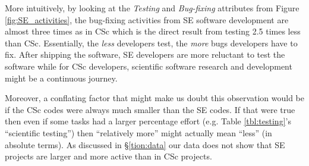\documentclass[conference,10pt]{IEEEtran}
\begin{document}
More intuitively, by looking at the \textit{Testing} and \textit{Bug-fixing} attributes from Figure \ref{fig:SE_activities}, the bug-fixing activities from SE software development are almost three times as in CSc which is the direct result from testing 2.5 times less than CSc. Essentially, the \textit{less} developers test, the \textit{more} bugs developers have to fix. After shipping the software, SE developers are more reluctant to test the software while for CSc developers, scientific software research and development might be a continuous journey.

Moreover, a conflating factor that might make us doubt this observation would be if the CSc codes were always much smaller than the SE codes. If that were true then even if some tasks had a larger percentage effort 
(e.g. Table \ref{tbl:testing}'s ``scientific testing'') then  ``relatively more'' might actually
mean ``less'' (in absolute terms). 
As discussed in \S\ref{tion:data} our data does not show that  SE projects are larger and more active
than in CSc projects.










 
\end{document}
